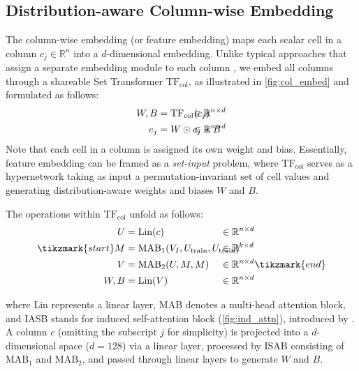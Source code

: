 \documentclass{article}
\theoremstyle{plain}
\theoremstyle{definition}
\theoremstyle{remark}
\newcommand{\TFcol}{\text{TF}_{\text{col}}}
\begin{document}
\subsection{Distribution-aware Column-wise Embedding} \label{sec:tfcol}

The column-wise embedding (or feature embedding) maps each scalar cell in a column $c_j \in \mathbb{R}^n$ into a $d$-dimensional embedding. Unlike typical approaches that assign a separate embedding module to each column \cite{gorishniyEmbeddingsNumericalFeatures2022}, we embed all columns through a shareable Set Transformer $\TFcol$, as illustrated in \cref{fig:col_embed} and formulated as follows:
\begin{align}
    W,B  &= \TFcol(c_j) &&\hspace{-4em} \in \mathbb{R}^{n \times d} \label{eq:st} \\
    e_j  &= W \odot c_j + B        &&\hspace{-4em} \in \mathbb{R}^{n \times d} \label{eq:fe6}
\end{align} 
Note that each cell in a column is assigned its own weight and bias. Essentially, feature embedding can be framed as a \emph{set-input} problem, where $\TFcol$ serves as a hypernetwork taking as input a permutation-invariant set of cell values and generating distribution-aware weights and biases $W$ and $B$.

The operations within $\TFcol$ unfold as follows:
\begin{align}
U &= \text{Lin}(c)      &&\hspace{-3em} \in \mathbb{R}^{n \times d} \label{eq:lin_X} \\
\tikzmark{start}M &= \text{MAB}_1(V_I, U_{\text{train}}, U_{\text{train}}) &&\hspace{-3em} \in \mathbb{R}^{k \times d} \label{eq:M} \\
V &= \text{MAB}_2(U, M, M) &&\hspace{-3em} \in \mathbb{R}^{n \times d} \label{eq:V}\tikzmark{end} \\
W, B &= \text{Lin}(V)    &&\hspace{-3em} \in \mathbb{R}^{n \times d} \label{eq:lin_WB}
\end{align}
\hspace{-0.095cm}where Lin represents a linear layer, MAB denotes a multi-head attention block, and IASB stands for induced self-attention block (\cref{fig:ind_attn}), introduced by \cite{leeSetTransformerFramework2019}. A column \( c \) (omitting the subscript \( j \) for simplicity) is projected into a \( d \)-dimensional space (\( d = 128 \)) via a linear layer, processed by ISAB consisting of \(\text{MAB}_1\) and \(\text{MAB}_2\), and passed through linear layers to generate $W$ and $B$.
\end{document}
